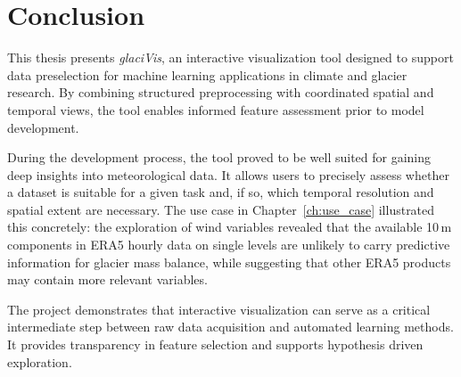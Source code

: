 \chapter{Conclusion}
This thesis presents \textit{glaciVis}, an interactive visualization tool designed to support data preselection for machine learning applications in climate and glacier research.
By combining structured preprocessing with coordinated spatial and temporal views, the tool enables informed feature assessment prior to model development.

During the development process, the tool proved to be well suited for gaining deep insights into meteorological data.
It allows users to precisely assess whether a dataset is suitable for a given task and, if so, which temporal resolution and spatial extent are necessary. The use case in Chapter~\ref{ch:use_case} illustrated this concretely: the exploration of wind variables revealed that the available 10\,m components in ERA5 hourly data on single levels are unlikely to carry predictive information for glacier mass balance, while
suggesting that other ERA5 products may contain more relevant variables.

The project demonstrates that interactive visualization can serve as a critical intermediate step between raw data acquisition and automated learning methods.
It provides transparency in feature selection and supports hypothesis driven exploration.